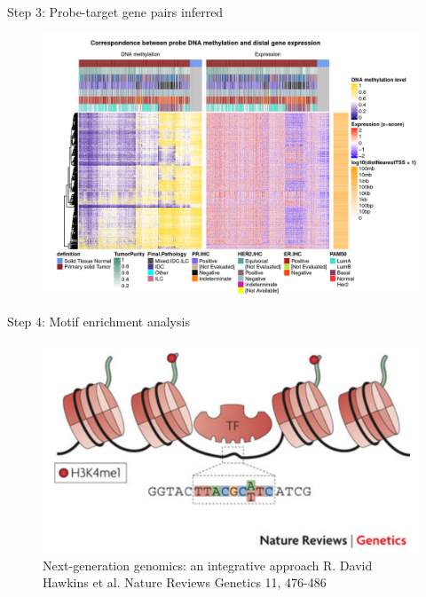 \documentclass[slidestop,compress,11pt,xcolor=dvipsnames]{beamer}
\begin{document}
\begin{frame}{Step 3: Probe-target gene pairs inferred}
 \vspace*{-0.3cm}
 \begin{figure}
  \centering
  \includegraphics[width=1.0\linewidth]{ELMER/heatmappair.jpg}
 \end{figure}
\end{frame}


\begin{frame}{Step 4: Motif enrichment analysis}

 \vspace*{-0.3cm}
 \begin{figure}
  \centering
  \includegraphics[width=1.0\linewidth]{ELMER/tf_binding.png}{\tiny{\\Next-generation genomics: an integrative approach R. David Hawkins et al. Nature Reviews Genetics 11, 476-486}}
 \end{figure}
\end{frame}
\end{document}
